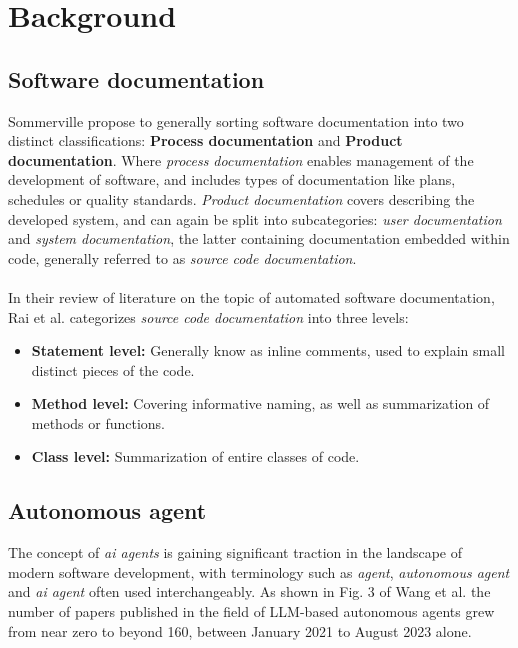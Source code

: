 \section{Background}

\subsection{Software documentation}
Sommerville \cite{sommerville2001software} propose to generally sorting software documentation into two distinct classifications: \textbf{Process documentation} and \textbf{Product documentation}.
Where \textit{process documentation} enables management of the development of software, and includes types of documentation like plans, schedules or quality standards. \textit{Product documentation} covers describing the developed system, and can again be split into subcategories: \textit{user documentation} and \textit{system documentation}, the latter containing documentation embedded within code, generally referred to as \textit{source code documentation}.
\\\\
In their review of literature on the topic of automated software documentation, Rai et al. \cite{rai2022review} categorizes \textit{source code documentation} into three levels:
\begin{itemize}
    \item \textbf{Statement level:} Generally know as inline comments, used to explain small distinct pieces of the code.
    \item \textbf{Method level:} Covering informative naming, as well as summarization of methods or functions.
    \item \textbf{Class level:} Summarization of entire classes of code.
\end{itemize}

\subsection{Autonomous agent}
\label{sec:Autonomous agent}
The concept of \textit{ai agents} is gaining significant traction in the landscape of modern software development, with terminology such as \textit{agent}, \textit{autonomous agent} and \textit{ai agent} often used interchangeably. As shown in Fig. 3 of Wang et al.\cite{wang2024survey} the number of papers published in the field of LLM-based autonomous agents grew from near zero to beyond 160, between January 2021 to August 2023 alone.

